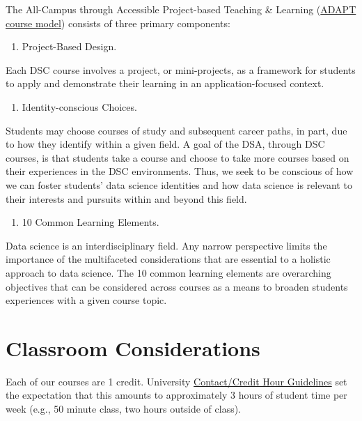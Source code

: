 \documentclass[
]{book}
\providecommand{\tightlist}{%
  \setlength{\itemsep}{0pt}\setlength{\parskip}{0pt}}
\begin{document}
The All-Campus through Accessible Project-based Teaching \& Learning (\href{https://datascienceacademy.ncsu.edu/courses/course-model/}{ADAPT course model}) consists of three primary components:

\begin{enumerate}
\def\labelenumi{\arabic{enumi})}
\tightlist
\item
  Project-Based Design.
\end{enumerate}

Each DSC course involves a project, or mini-projects, as a framework for students to apply and demonstrate their learning in an application-focused context.

\begin{enumerate}
\def\labelenumi{\arabic{enumi})}
\setcounter{enumi}{1}
\tightlist
\item
  Identity-conscious Choices.
\end{enumerate}

Students may choose courses of study and subsequent career paths, in part, due to how they identify within a given field. A goal of the DSA, through DSC courses, is that students take a course and choose to take more courses based on their experiences in the DSC environments. Thus, we seek to be conscious of how we can foster students' data science identities and how data science is relevant to their interests and pursuits within and beyond this field.

\begin{enumerate}
\def\labelenumi{\arabic{enumi})}
\setcounter{enumi}{2}
\tightlist
\item
  10 Common Learning Elements.
\end{enumerate}

Data science is an interdisciplinary field. Any narrow perspective limits the importance of the multifaceted considerations that are essential to a holistic approach to data science. The 10 common learning elements are overarching objectives that can be considered across courses as a means to broaden students experiences with a given course topic.

\hypertarget{classroom-considerations}{%
\section{Classroom Considerations}\label{classroom-considerations}}

Each of our courses are 1 credit. University \href{https://oucc.dasa.ncsu.edu/courses/contact-credit-hours/}{Contact/Credit Hour Guidelines} set the expectation that this amounts to approximately 3 hours of student time per week (e.g., 50 minute class, two hours outside of class).
\end{document}
